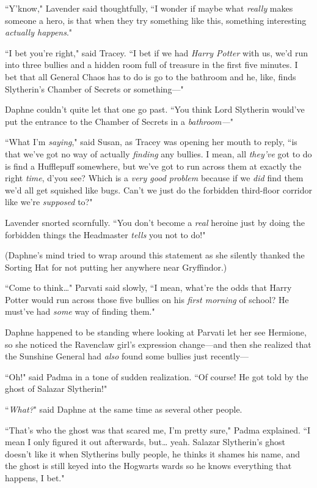 ``Y'know," Lavender said thoughtfully, ``I wonder if maybe what \emph{really} makes someone a hero, is that when they try something like this, something interesting \emph{actually happens}."

``I bet you're right," said Tracey. ``I bet if we had \emph{Harry Potter} with us, we'd run into three bullies and a hidden room full of treasure in the first five minutes. I bet that all General Chaos has to do is go to the bathroom and he, like, finds Slytherin's Chamber of Secrets or something—"

Daphne couldn't quite let that one go past. ``You think Lord Slytherin would've put the entrance to the Chamber of Secrets in a \emph{bathroom—}"

``What I'm \emph{saying}," said Susan, as Tracey was opening her mouth to reply, ``is that we've got no way of actually \emph{finding} any bullies. I mean, all \emph{they've} got to do is find a Hufflepuff somewhere, but we've got to run across them at exactly the right \emph{time}, d'you see? Which is a \emph{very good problem} because if we \emph{did} find them we'd all get squished like bugs. Can't we just do the forbidden third-floor corridor like we're \emph{supposed} to?"

Lavender snorted scornfully. ``You don't become a \emph{real} heroine just by doing the forbidden things the Headmaster \emph{tells} you not to do!"

(Daphne's mind tried to wrap around this statement as she silently thanked the Sorting Hat for not putting her anywhere near Gryffindor.)

``Come to think{\ldots}" Parvati said slowly, ``I mean, what're the odds that Harry Potter would run across those five bullies on his \emph{first morning} of school? He must've had \emph{some} way of finding them."

Daphne happened to be standing where looking at Parvati let her see Hermione, so she noticed the Ravenclaw girl's expression change—and then she realized that the Sunshine General had \emph{also} found some bullies just recently—

``Oh!" said Padma in a tone of sudden realization. ``Of course! He got told by the ghost of Salazar Slytherin!"

``\emph{What?}" said Daphne at the same time as several other people.

``That's who the ghost was that scared me, I'm pretty sure," Padma explained. ``I mean I only figured it out afterwards, but{\ldots} yeah. Salazar Slytherin's ghost doesn't like it when Slytherins bully people, he thinks it shames his name, and the ghost is still keyed into the Hogwarts wards so he knows everything that happens, I bet."

